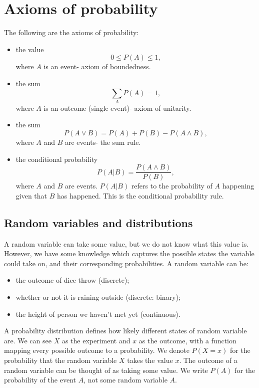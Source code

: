 \documentclass[a4paper, openany]{memoir}
\begin{document}
\section{Axioms of probability}
The following are the axioms of probability:
\begin{itemize}
    \item the value
    \[0 \leq P(A) \leq 1,\]
    where $A$ is an event- axiom of boundedness.
    
    \item the sum
    \[\sum_A P(A) = 1,\]
    where $A$ is an outcome (single event)- axiom of unitarity.

    \item the sum
    \[P(A \lor B) = P(A) + P(B) - P(A \land B),\]
    where $A$ and $B$ are events- the sum rule.

    \item the conditional probability
    \[P(A|B) = \frac{P(A \land B)}{P(B)},\]
    where $A$ and $B$ are events. $P(A|B)$ refers to the probability of $A$ happening given that $B$ has happened. This is the conditional probability rule.
\end{itemize}

\subsection{Random variables and distributions}
A random variable can take some value, but we do not know what this value is. However, we have some knowledge which captures the possible states the variable could take on, and their corresponding probabilities. A random variable can be:
\begin{itemize}
    \item the outcome of dice throw (discrete);
    \item whether or not it is raining outside (discrete: binary);
    \item the height of person we haven't met yet (continuous).
\end{itemize}

A probability distribution defines how likely different states of random variable are. We can see $X$ as the experiment and $x$ as the outcome, with a function mapping every possible outcome to a probability. We denote $P(X = x)$ for the probability that the random variable $X$ takes the value $x$. The outcome of a random variable can be thought of as taking some value. We write $P(A)$ for the probability of the event $A$, not some random variable $A$.
\end{document}
